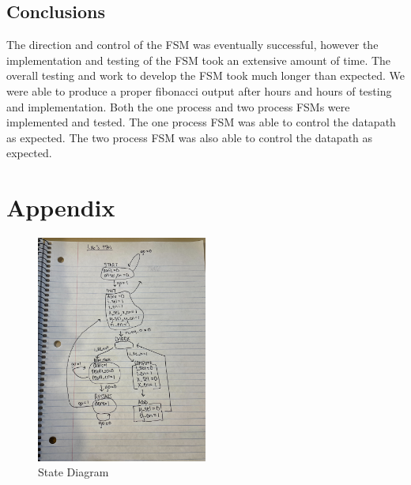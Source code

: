\documentclass{article}
\begin{document}
\subsection*{Conclusions}

The direction and control of the FSM was eventually successful, however the implementation and testing of the FSM took an extensive amount of time. The overall testing and work to develop the FSM took much longer than expected. We were able to produce a proper fibonacci output after hours and hours of testing and implementation. Both the one process and two process FSMs were implemented and tested. The one process FSM was able to control the datapath as expected. The two process FSM was also able to control the datapath as expected.

\section*{Appendix}

\begin{figure}[H]
  \centering
  \includegraphics[width=0.5\textwidth]{state_diagram.jpg}
  \caption{State Diagram}
  \label{fig:state-diagram}
\end{figure}
\end{document}
